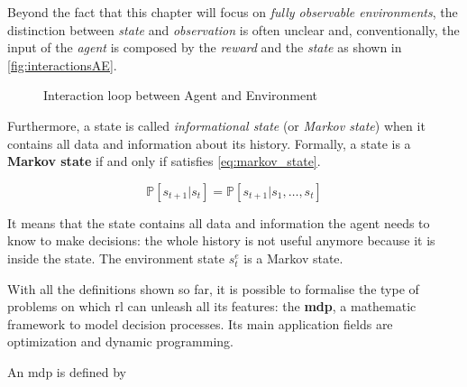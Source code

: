 Beyond the fact that this chapter will focus on \textit{fully observable environments}, the distinction between \textit{state} and \textit{observation} is often unclear and, conventionally, the input of the \textit{agent} is composed by the \textit{reward} and the \textit{state} as shown in \vref{fig:interactionsAE}.

\begin{figure}
	\centering
	\caption[Interaction loop between Agent and Environment]{Interaction loop between Agent and Environment}
	\label{fig:interactionsAE}
\end{figure}


Furthermore, a state is called \textit{informational state} (or \textit{Markov state}) when it contains all data and information about its history. Formally, a state is a \textbf{Markov state} if and only if satisfies \vref{eq:markov_state}.

\begin{equation} \label{eq:markov_state}
	\mathbb{P}[s_{t+1}| s_t] = \mathbb{P}[s_{t+1} | s_1, \dots, s_t]
\end{equation}

 It means that the state contains all data and information the agent needs to know to make decisions: the whole history is not useful anymore because it is inside the state. The environment state $s_t^e$ is a Markov state.
 
 With all the definitions shown so far, it is possible to formalise the type of problems on which \acrshort{rl} can unleash all its features: the \textbf{\acrfull{mdp}}, a mathematic framework to model decision processes. Its main application fields are optimization and dynamic programming.
 
 An \acrshort{mdp} is defined by 

